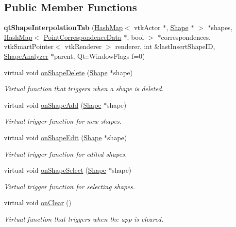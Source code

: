 \subsection*{Public Member Functions}
\begin{DoxyCompactItemize}
\item 
\hypertarget{classqt_shape_interpolation_tab_a81e12bc1650f508da0a30903a5ee54d5}{}{\bfseries qt\+Shape\+Interpolation\+Tab} (\hyperlink{class_hash_map}{Hash\+Map}$<$ vtk\+Actor $\ast$, \hyperlink{class_shape}{Shape} $\ast$ $>$ $\ast$shapes, \hyperlink{class_hash_map}{Hash\+Map}$<$ \hyperlink{class_point_correspondence_data}{Point\+Correspondence\+Data} $\ast$, bool $>$ $\ast$correspondences, vtk\+Smart\+Pointer$<$ vtk\+Renderer $>$ renderer, int \&last\+Insert\+Shape\+I\+D, \hyperlink{class_shape_analyzer}{Shape\+Analyzer} $\ast$parent, Qt\+::\+Window\+Flags f=0)\label{classqt_shape_interpolation_tab_a81e12bc1650f508da0a30903a5ee54d5}

\item 
virtual void \hyperlink{classqt_shape_interpolation_tab_aac6776b2f521abe2d9aa6f932665cf57}{on\+Shape\+Delete} (\hyperlink{class_shape}{Shape} $\ast$shape)
\begin{DoxyCompactList}\small\item\em Virtual function that triggers when a shape is deleted. \end{DoxyCompactList}\item 
virtual void \hyperlink{classqt_shape_interpolation_tab_a9801bcf3d2e1b31a79824d8b623e1762}{on\+Shape\+Add} (\hyperlink{class_shape}{Shape} $\ast$shape)
\begin{DoxyCompactList}\small\item\em Virtual trigger function for new shapes. \end{DoxyCompactList}\item 
virtual void \hyperlink{classqt_shape_interpolation_tab_a556d7b2a445f0cd5f6a5fd1f912d144a}{on\+Shape\+Edit} (\hyperlink{class_shape}{Shape} $\ast$shape)
\begin{DoxyCompactList}\small\item\em Virtual trigger function for edited shapes. \end{DoxyCompactList}\item 
virtual void \hyperlink{classqt_shape_interpolation_tab_a4db77c18d8b2257ac14654ef7c9f5ecd}{on\+Shape\+Select} (\hyperlink{class_shape}{Shape} $\ast$shape)
\begin{DoxyCompactList}\small\item\em Virtual trigger function for selecting shapes. \end{DoxyCompactList}\item 
virtual void \hyperlink{classqt_shape_interpolation_tab_a71ad9a70adc5408de4ceb94467953d8c}{on\+Clear} ()
\begin{DoxyCompactList}\small\item\em Virtual function that triggers when the app is cleared. \end{DoxyCompactList}\end{DoxyCompactItemize}


